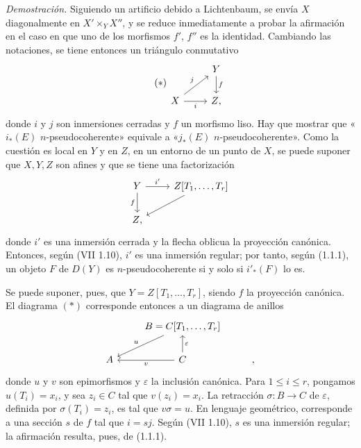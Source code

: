 \providecommand{\sisi}[2]{#2}

\emph{Demostración.} Siguiendo un artificio debido a Lichtenbaum, se envía \(X\) diagonalmente en \(X'\times_YX''\), y se reduce inmediatamente a probar la afirmación en el caso en que uno de los morfismos \(f'\), \(f''\) es la identidad. Cambiando las notaciones, se tiene entonces un triángulo conmutativo
\begin{equation}\tag{$*$}
\begin{tikzcd}
& Y \arrow[d,"f"]\\
X \arrow[r,"i"'] \arrow[ur,"j"] & Z{,}
\end{tikzcd}
\end{equation}
donde \(i\) y \(j\) son inmersiones cerradas y \(f\) un morfismo liso. Hay que mostrar que «\(i_*(E)\) \(n\)-pseudocoherente» equivale a «\(j_*(E)\) \(n\)-pseudocoherente». Como la cuestión es local en \(Y\) y en \(Z\), en un entorno de un punto de \(X\), se puede suponer que \(X,Y,Z\) son afines y que se tiene una factorización
\[
\begin{tikzcd}
Y \arrow[r,"i'"] \arrow[d,"f"'] & Z[T_1,\ldots,T_r]\arrow[dl]\\
Z{,}&
\end{tikzcd}
\]
donde \(i'\) es una inmersión cerrada y la flecha oblicua la proyección canónica. Entonces, según (VII 1.10), \(i'\) es una inmersión regular; por tanto, según (1.1.1), un objeto \(F\) de \(D(Y)\) es \(n\)-pseudocoherente si y solo si \(i'_*(F)\) lo es.

Se puede suponer, pues, que \(Y=Z[T_1,\ldots,T_r]\), siendo \(f\) la proyección canónica. El diagrama \((*)\) corresponde entonces a un diagrama de anillos
\[
\begin{tikzcd}
& B=C[T_1,\ldots,T_r] \arrow[dl,"u"'] & \\
A & C \arrow[l,"v"] \arrow[u,"\varepsilon"'] & {,}
\end{tikzcd}
\]
donde \(u\) y \(v\) son epimorfismos y \(\varepsilon\) la inclusión canónica. Para \(1\leq i\leq r\), pongamos \(u(T_i)=x_i\), y sea \(z_i\in C\) tal que \(v(z_i)=x_i\). La retracción \(\sigma:B\longrightarrow C\) de \(\varepsilon\), definida por \(\sigma(T_i)=z_i\), es tal que \(v\sigma=u\). En lenguaje geométrico, corresponde a una sección \(s\) de \(f\) tal que \(i=sj\). Según (VII 1.10), \(s\) es una inmersión regular; la afirmación resulta, pues, de (1.1.1).

